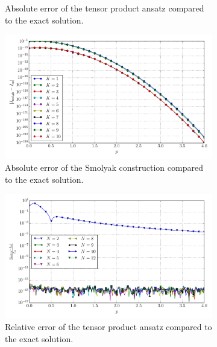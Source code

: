 \documentclass[a4paper,10pt]{article}
\begin{document}
\begin{figure}[ht!]
\begin{subfigure}[t]{0.5\linewidth}
    \caption{Absolute error of the tensor product ansatz compared to the exact solution.}
    \label{fig:tp_sg_3d_conv_p_040_400_err_nsd_tp}
  \end{subfigure}
  \begin{subfigure}[t]{0.5\linewidth}
    \includegraphics[width=\linewidth]{./plots/tp_sg_3d_conv_p_(0,4,0)_(4,0,0)_err_nsd_gk.pdf}
    \caption{Absolute error of the Smolyak construction compared to the exact solution.}
    \label{fig:tp_sg_3d_conv_p_040_400_err_nsd_gk}
  \end{subfigure}
  \begin{subfigure}[t]{0.5\linewidth}
    \includegraphics[width=\linewidth]{./plots/tp_sg_3d_conv_p_(0,4,0)_(4,0,0)_err_rel_nsd_tp.pdf}
    \caption{Relative error of the tensor product ansatz compared to the exact solution.}
    \label{fig:tp_sg_3d_conv_p_040_400_err_rel_nsd_tp}
  \end{subfigure}
  \begin{subfigure}[t]{0.5\linewidth}

\end{subfigure}
\end{figure}
\end{document}
